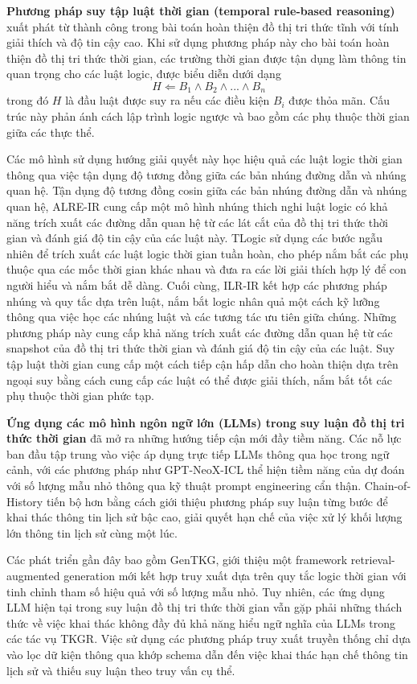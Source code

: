 \textbf{Phương pháp suy tập luật thời gian (temporal rule-based reasoning)} xuất phát từ thành công trong bài toán hoàn thiện đồ thị tri thức tĩnh với tính giải thích và độ tin cậy cao. Khi sử dụng phương pháp này cho bài toán hoàn thiện đồ thị tri thức thời gian, các trường thời gian được tận dụng làm thông tin quan trọng cho các luật logic, được biểu diễn dưới dạng 
\[
H \Leftarrow B_1 \wedge B_2 \wedge ... \wedge B_n
\]
trong đó $H$ là đầu luật được suy ra nếu các điều kiện $B_i$ được thỏa mãn. Cấu trúc này phản ánh cách lập trình logic ngược và bao gồm các phụ thuộc thời gian giữa các thực thể.

Các mô hình sử dụng hướng giải quyết này học hiệu quả các luật logic thời gian thông qua việc tận dụng độ tương đồng giữa các bản nhúng đường dẫn và nhúng quan hệ. Tận dụng độ tương đồng cosin giữa các bản nhúng đường dẫn và nhúng quan hệ, ALRE-IR cung cấp một mô hình nhúng thich nghi luật logic có khả năng trích xuất các đường dẫn quan hệ từ các lát cắt của đồ thị tri thức thời gian và đánh giá độ tin cậy của các luật này. TLogic sử dụng các bước ngẫu nhiên để trích xuất các luật logic thời gian tuần hoàn, cho phép nắm bắt các phụ thuộc qua các mốc thời gian khác nhau và đưa ra các lời giải thích hợp lý để con người hiểu và nắm bắt dễ dàng. Cuối cùng, ILR-IR kết hợp các phương pháp nhúng và quy tắc dựa trên luật, nắm bắt logic nhân quả một cách kỹ lưỡng thông qua việc học các nhúng luật và các tương tác ưu tiên giữa chúng. Những phương pháp này cung cấp khả năng trích xuất các đường dẫn quan hệ từ các snapshot của đồ thị tri thức thời gian và đánh giá độ tin cậy của các luật. Suy tập luật thời gian cung cấp một cách tiếp cận hấp dẫn cho hoàn thiện dựa trên ngoại suy bằng cách cung cấp các luật có thể được giải thích, nắm bắt tốt các phụ thuộc thời gian phức tạp.


\textbf{Ứng dụng các mô hình ngôn ngữ lớn (LLMs) trong suy luận đồ thị tri thức thời gian} đã mở ra những hướng tiếp cận mới đầy tiềm năng. Các nỗ lực ban đầu tập trung vào việc áp dụng trực tiếp LLMs thông qua học trong ngữ cảnh, với các phương pháp như GPT-NeoX-ICL thể hiện tiềm năng của dự đoán với số lượng mẫu nhỏ thông qua kỹ thuật prompt engineering cẩn thận. Chain-of-History tiến bộ hơn bằng cách giới thiệu phương pháp suy luận từng bước để khai thác thông tin lịch sử bậc cao, giải quyết hạn chế của việc xử lý khối lượng lớn thông tin lịch sử cùng một lúc.

Các phát triển gần đây bao gồm GenTKG, giới thiệu một framework retrieval-augmented generation mới kết hợp truy xuất dựa trên quy tắc logic thời gian với tinh chỉnh tham số hiệu quả với số lượng mẫu nhỏ. Tuy nhiên, các ứng dụng LLM hiện tại trong suy luận đồ thị tri thức thời gian vẫn gặp phải những thách thức về việc khai thác không đầy đủ khả năng hiểu ngữ nghĩa của LLMs trong các tác vụ TKGR. Việc sử dụng các phương pháp truy xuất truyền thống chỉ dựa vào lọc dữ kiện thông qua khớp schema dẫn đến việc khai thác hạn chế thông tin lịch sử và thiếu suy luận theo truy vấn cụ thể.


